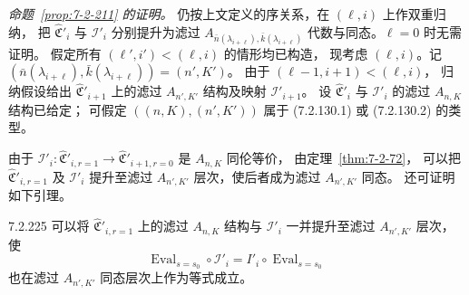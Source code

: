 
\par\noindent\textit{命题~\ref{prop:7-2-211} 的证明。}
仍按上文定义的序关系，在 $(\ell,i)$ 上作双重归纳，
把 $\widehat{\mathfrak C}'_i$ 与 $\mathcal I'_i$
分别提升为滤过
$A_{\bar n(\lambda_{i+\ell}),\bar k(\lambda_{i+\ell})}$
代数与同态。$\ell=0$ 时无需证明。
假定所有 $(\ell',i')<(\ell,i)$ 的情形均已构造，
现考虑 $(\ell,i)$。记
$(\bar n(\lambda_{i+\ell}),\bar k(\lambda_{i+\ell}))=(n',K')$。
由于 $(\ell-1,i+1)<(\ell,i)$，
归纳假设给出 $\widehat{\mathfrak C}'_{i+1}$
上的滤过 $A_{n',K'}$ 结构及映射 $\mathcal I'_{i+1}$。
设 $\widehat{\mathfrak C}'_i$ 与 $\mathcal I'_i$
的滤过 $A_{n,K}$ 结构已给定；
可假定 $((n,K),(n',K'))$ 属于
(7.2.130.1) 或 (7.2.130.2) 的类型。

由于
$\mathcal I'_i\colon
\widehat{\mathfrak C}'_{i,r=1}
\to\widehat{\mathfrak C}'_{i+1,r=0}$
是 $A_{n,K}$ 同伦等价，
由定理~\ref{thm:7-2-72}，
可以把 $\widehat{\mathfrak C}'_{i,r=1}$
及 $\mathcal I'_i$ 提升至滤过 $A_{n',K'}$
层次，使后者成为滤过 $A_{n',K'}$ 同态。
还可证明如下引理。

\begin{lemma}{7.2.225}\label{lem:7-2-225}
可以将 $\widehat{\mathfrak C}'_{i,r=1}$
上的滤过 $A_{n,K}$ 结构与 $\mathcal I'_i$
一并提升至滤过 $A_{n',K'}$ 层次，使
\[
\operatorname{Eval}_{s=s_0}\circ\mathcal I'_i
=I'_i\circ\operatorname{Eval}_{s=s_0}
\]
也在滤过 $A_{n',K'}$ 同态层次上作为等式成立。
\end{lemma}

